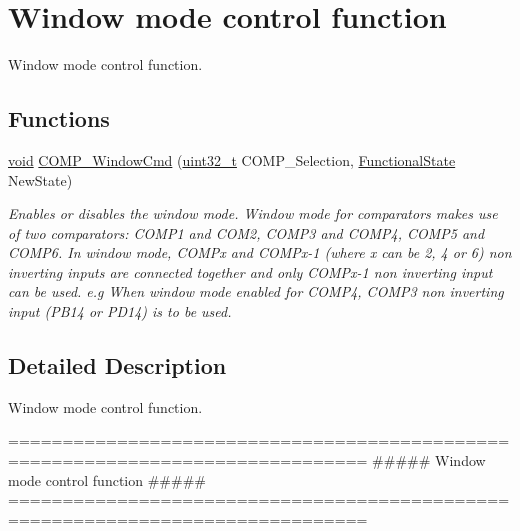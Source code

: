 \hypertarget{group___c_o_m_p___group2}{\section{Window mode control function}
\label{group___c_o_m_p___group2}
}


Window mode control function.  


\subsection*{Functions}
\begin{DoxyCompactItemize}
\item 
\hyperlink{group___n_a_m_e_ga18028b8badbf1ea7e704ccac3c488e82}{void} \hyperlink{group___c_o_m_p___group2_ga6719a2acd8baf5b9d380d6c1fed7c1c9}{C\-O\-M\-P\-\_\-\-Window\-Cmd} (\hyperlink{stdint_8h_a435d1572bf3f880d55459d9805097f62}{uint32\-\_\-t} C\-O\-M\-P\-\_\-\-Selection, \hyperlink{group___exported__types_gac9a7e9a35d2513ec15c3b537aaa4fba1}{Functional\-State} New\-State)
\begin{DoxyCompactList}\small\item\em Enables or disables the window mode. Window mode for comparators makes use of two comparators\-: C\-O\-M\-P1 and C\-O\-M2, C\-O\-M\-P3 and C\-O\-M\-P4, C\-O\-M\-P5 and C\-O\-M\-P6. In window mode, C\-O\-M\-Px and C\-O\-M\-Px-\/1 (where x can be 2, 4 or 6) non inverting inputs are connected together and only C\-O\-M\-Px-\/1 non inverting input can be used. e.\-g When window mode enabled for C\-O\-M\-P4, C\-O\-M\-P3 non inverting input (P\-B14 or P\-D14) is to be used. \end{DoxyCompactList}\end{DoxyCompactItemize}


\subsection{Detailed Description}
Window mode control function. \begin{DoxyVerb} ===============================================================================
                    ##### Window mode control function #####
 ===============================================================================  \end{DoxyVerb}
 

